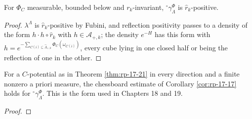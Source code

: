 \begin{theorem}[Georgii (17.21)]
    \label{thm:rp-17-21}
    \leanok

    For $\Phi_C$ measurable, bounded below and $r_k$-invariant, ${}^\circ\gamma_\Lambda^\Phi$ is
    $\hat r_k$-positive.
\end{theorem}
\begin{proof}
    \leanok
    $\lambda^\Lambda$ is $\hat r_k$-positive by Fubini, and reflection positivity passes to a
    density of the form $h \cdot h \circ \hat r_k$ with $h \in \mathcal A_{+,k}$; the density
    $e^{-H}$ has this form with $h = e^{-\sum_{C(i) \subseteq \hat\Lambda_{+,k}} \Phi_C(\omega_{C(i)})}$,
    every cube lying in one closed half or being the reflection of one in the other.
\end{proof}

\begin{corollary}
    \label{cor:rp-17-17-gibbs}
    \leanok

    For a $C$-potential as in Theorem \ref{thm:rp-17-21} in every direction and a finite
    nonzero a priori measure, the chessboard estimate of Corollary \ref{cor:rp-17-17} holds for
    ${}^\circ\gamma_\Lambda^\Phi$. This is the form used in Chapters 18 and 19.
\end{corollary}
\begin{proof}
    \leanok
\end{proof}

